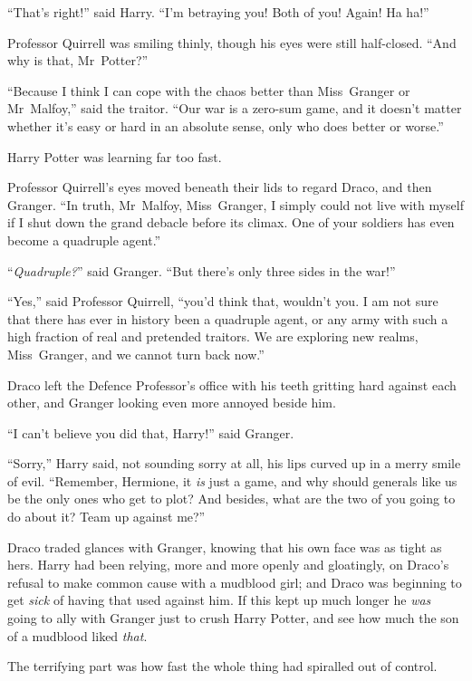 “That’s right!” said Harry.
“I’m betraying you! Both of you! Again! Ha ha!”

Professor Quirrell was smiling thinly, though his eyes were still half-closed.
“And why is that, Mr~Potter?”

“Because I think I can cope with the chaos better than Miss~Granger or Mr~Malfoy,” said the traitor.
“Our war is a zero-sum game, and it doesn’t matter whether it’s easy or hard in an absolute sense, only who does better or worse.”

Harry Potter was learning far too fast.

Professor Quirrell’s eyes moved beneath their lids to regard Draco, and then Granger.
“In truth, Mr~Malfoy, Miss~Granger, I simply could not live with myself if I shut down the grand debacle before its climax. One of your soldiers has even become a quadruple agent.”

“\emph{Quadruple?}” said Granger.
“But there’s only three sides in the war!”

“Yes,” said Professor Quirrell, “you’d think that, wouldn’t you. I am not sure that there has ever in history been a quadruple agent, or any army with such a high fraction of real and pretended traitors. We are exploring new realms, Miss~Granger, and we cannot turn back now.”

Draco left the Defence Professor’s office with his teeth gritting hard against each other, and Granger looking even more annoyed beside him.

“I can’t believe you did that, Harry!” said Granger.

“Sorry,” Harry said, not sounding sorry at all, his lips curved up in a merry smile of evil.
“Remember, Hermione, it \emph{is} just a game, and why should generals like us be the only ones who get to plot? And besides, what are the two of you going to do about it? Team up against me?”

Draco traded glances with Granger, knowing that his own face was as tight as hers. Harry had been relying, more and more openly and gloatingly, on Draco’s refusal to make common cause with a mudblood girl; and Draco was beginning to get \emph{sick} of having that used against him. If this kept up much longer he \emph{was} going to ally with Granger just to crush Harry Potter, and see how much the son of a mudblood liked \emph{that}.

\later

The terrifying part was how fast the whole thing had spiralled out of control.

